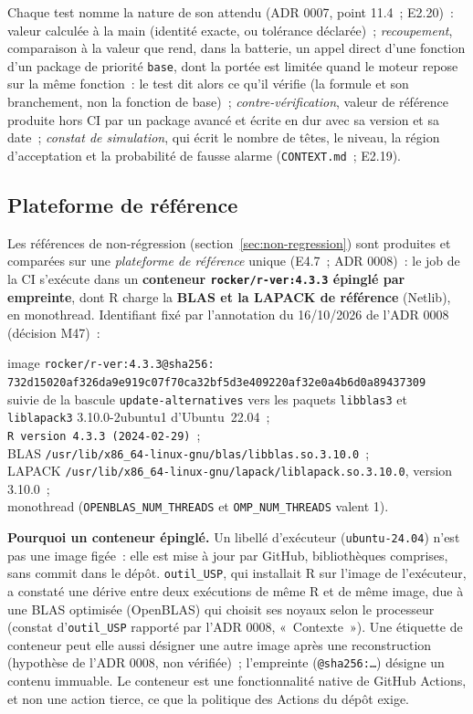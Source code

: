\documentclass[a4paper,11pt]{article}
\newcommand{\code}[1]{\texttt{\small #1}}
\begin{document}
\medskip
Chaque test nomme la nature de son attendu (ADR 0007, point 11.4~; E2.20)~:
valeur calculée à la main (identité exacte, ou tolérance déclarée)~;
\emph{recoupement}, comparaison à la valeur que rend, dans la batterie, un appel
direct d'une fonction d'un package de priorité \code{base}, dont la portée est
limitée quand le moteur repose sur la même fonction~: le test dit alors ce
qu'il vérifie (la formule et son branchement, non la fonction de base)~;
\emph{contre-vérification}, valeur de référence produite hors CI par un package
avancé et écrite en dur avec sa version et sa date~; \emph{constat de
simulation}, qui écrit le nombre de têtes, le niveau, la région d'acceptation
et la probabilité de fausse alarme (\code{CONTEXT.md}~; E2.19).

\subsection{Plateforme de référence}
\label{sec:plateforme}

Les références de non-régression (section~\ref{sec:non-regression}) sont
produites et comparées sur une \emph{plateforme de référence} unique (E4.7~;
ADR 0008)~: le job de la CI s'exécute dans un \textbf{conteneur
\code{rocker/r-ver:4.3.3} épinglé par empreinte}, dont R charge la \textbf{BLAS
et la LAPACK de référence} (Netlib), en monothread. Identifiant fixé par
l'annotation du 16/10/2026 de l'ADR 0008 (décision M47)~:

\begin{encadre}
\small
image \code{rocker/r-ver:4.3.3@sha256:}\\
\code{\phantom{image }732d15020af326da9e919c07f70ca32bf5d3e409220af32e0a4b6d0a89437309}\\
suivie de la bascule \code{update-alternatives} vers les paquets \code{libblas3}
et \code{liblapack3} 3.10.0-2ubuntu1 d'Ubuntu~22.04~;\\
\code{R version 4.3.3 (2024-02-29)}~;\\
BLAS \code{/usr/lib/x86\_64-linux-gnu/blas/libblas.so.3.10.0}~;\\
LAPACK \code{/usr/lib/x86\_64-linux-gnu/lapack/liblapack.so.3.10.0}, version 3.10.0~;\\
monothread (\code{OPENBLAS\_NUM\_THREADS} et \code{OMP\_NUM\_THREADS} valent 1).
\end{encadre}

\noindent
\textbf{Pourquoi un conteneur épinglé.} Un libellé d'exécuteur
(\code{ubuntu-24.04}) n'est pas une image figée~: elle est mise à jour par
GitHub, bibliothèques comprises, sans commit dans le dépôt. \code{outil\_USP},
qui installait R sur l'image de l'exécuteur, a constaté une dérive entre deux
exécutions de même R et de même image, due à une BLAS optimisée (OpenBLAS) qui
choisit ses noyaux selon le processeur (constat d'\code{outil\_USP} rapporté
par l'ADR 0008, «~Contexte~»). Une étiquette
de conteneur peut elle aussi désigner une autre image après une
reconstruction (hypothèse de l'ADR 0008, non vérifiée)~; l'empreinte
(\code{@sha256:\ldots}) désigne un contenu immuable. Le conteneur est une fonctionnalité native de GitHub Actions, et
non une action tierce, ce que la politique des Actions du dépôt exige.
\end{document}
